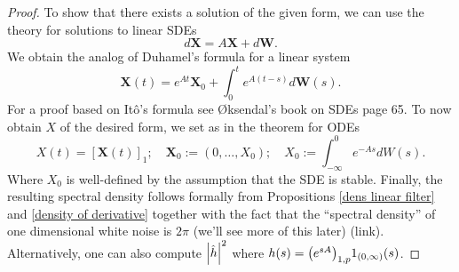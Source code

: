 \documentclass[12pt]{article}
\begin{document}
\begin{proof}
    To show that there exists a solution of the given form, we can use the  theory for solutions to linear SDEs
    \begin{equation*}
        d \mathbf{X}=A \mathbf{X} +d \mathbf{W} .
    \end{equation*}
    We obtain the analog of Duhamel's formula for a linear system
    \begin{equation*}
        \textbf{X}(t)= e^{At} \textbf{X}_0+\int_{0}^te^{A(t-s)} d \textbf{W}(s).
    \end{equation*}
    For a proof based on Itô's formula see Øksendal's book on SDEs \cite{oksendal2003stochastic} page 65. To now obtain $X$ of the desired form, we set as in the theorem for ODEs
    $$X(t)= [\textbf{X}(t)]_{1} ;\quad\textbf{X}_0:=(0,\ldots,X_0);\quad X_0:=\int_{-\infty}^0e^{-As} dW(s).$$ Where $X_0$ is well-defined by the assumption that the SDE is stable. Finally, the resulting spectral density follows formally from Propositions \ref{dens linear filter} and \ref{density of derivative} together with the fact that the ``spectral density'' of one dimensional white noise is $2\pi$ (we'll see more of this later) (link). Alternatively, one can also compute $\abs{\hat{h}}^2$ where
    $h(s)=\qty(e^{sA})_{1,p}1_{(0,\infty)}(s)$.
\end{proof}
\end{document}
